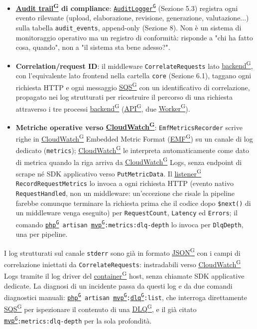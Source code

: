 \documentclass[a4paper,12pt]{article}
\providecommand{\glslink}[2]{\href{https://alittlebyte-19.github.io/Documentazione/glossario.html\#gls-#1}{\underline{#2}\textsuperscript{\scriptsize G}}}
\begin{document}
\begin{itemize}
    \item \textbf{\glslink{audit-trail}{Audit trail} di compliance}: \texttt{\glslink{auditlogger}{AuditLogger}} (Sezione 5.3) registra ogni evento rilevante (upload, elaborazione, revisione, generazione, valutazione...) sulla tabella \texttt{audit\_events}, append-only (Sezione 8). Non è un sistema di monitoraggio operativo ma un registro di conformità: risponde a "chi ha fatto cosa, quando", non a "il sistema sta bene adesso?".
    \item \textbf{Correlation/request ID}: il middleware \texttt{CorrelateRequests} lato \glslink{backend}{backend}, con l'equivalente lato frontend nella cartella \texttt{core} (Sezione 6.1), taggano ogni richiesta HTTP e ogni messaggio \glslink{sqs-simple-queue-service}{SQS} con un identificativo di correlazione, propagato nei log strutturati per ricostruire il percorso di una richiesta attraverso i tre processi \glslink{backend}{backend} (\glslink{api-application-programming-interface}{API}, due \glslink{worker}{Worker}).
    \item \textbf{Metriche operative verso \glslink{cloudwatch}{CloudWatch}}: \texttt{EmfMetricsRecorder} scrive righe in \glslink{cloudwatch}{CloudWatch} Embedded Metric Format (\glslink{emf}{EMF}) su un canale di log dedicato (\texttt{metrics}); \glslink{cloudwatch}{CloudWatch} le interpreta automaticamente come dato di metrica quando la riga arriva da \glslink{cloudwatch}{CloudWatch} Logs, senza endpoint di scrape né SDK applicativo verso \texttt{PutMetricData}. Il \glslink{listener}{listener} \texttt{RecordRequestMetrics} lo invoca a ogni richiesta HTTP (evento nativo \texttt{RequestHandled}, non un middleware: un'eccezione che risale la pipeline farebbe comunque terminare la richiesta prima che il codice dopo \texttt{\$next()} di un middleware venga eseguito) per \texttt{RequestCount}, \texttt{Latency} ed \texttt{Errors}; il comando \texttt{\glslink{php}{php} artisan \glslink{mvp-minimum-viable-product}{mvp}:metrics:dlq-depth} lo invoca per \texttt{DlqDepth}, una per pipeline.
\end{itemize}

I log strutturati sul canale \texttt{stderr} sono già in formato \glslink{json}{JSON} con i campi di correlazione iniettati da \texttt{CorrelateRequests}: instradabili verso \glslink{cloudwatch}{CloudWatch} Logs tramite il log driver del \glslink{container}{container} host, senza chiamate SDK applicative dedicate. La diagnosi di un incidente passa da questi log e da due comandi diagnostici manuali: \texttt{\glslink{php}{php} artisan \glslink{mvp-minimum-viable-product}{mvp}:\glslink{dlq-dead-letter-queue}{dlq}:list}, che interroga direttamente \glslink{sqs-simple-queue-service}{SQS} per ispezionare il contenuto di una \glslink{dlq-dead-letter-queue}{DLQ}, e il già citato \texttt{\glslink{mvp-minimum-viable-product}{mvp}:metrics:dlq-depth} per la sola profondità.
\end{document}
